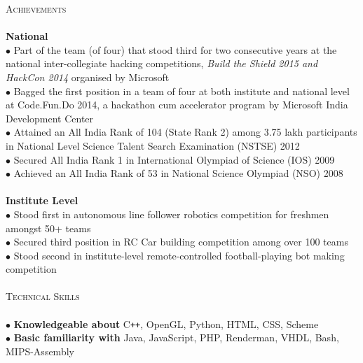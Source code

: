 \documentclass[a4paper,9pt]{article}
\begin{document}
\textcolor{myrust}{\large{\textsc{Achievements}}}\textcolor{mygray}{\sout{\hfill}}\\\\
\small %
\textbf{National}\\
$\bullet$ Part of the team (of four) that stood third for two consecutive years at the national inter-collegiate hacking competitions, \textsl{Build the Shield 2015 and HackCon 2014} organised by Microsoft\\ 
$\bullet$ Bagged the first position in a team of four at both institute and national level at Code.Fun.Do 2014, a hackathon cum accelerator program by Microsoft India Development Center\\ 
$\bullet$ Attained an All India Rank of 104 (State Rank 2) among 3.75 lakh participants in National Level Science Talent Search Examination (NSTSE) 2012\\ 
$\bullet$ Secured All India Rank 1 in International Olympiad of Science (IOS) 2009\\ 
$\bullet$ Achieved an All India Rank of 53 in National Science Olympiad (NSO) 2008\\\\
\textbf{Institute Level}\\
$\bullet$ Stood first in autonomous line follower robotics competition for freshmen amongst 50+ teams\\ 
$\bullet$ Secured third position in RC Car building competition among over 100 teams\\ 
$\bullet$ Stood second in institute-level remote-controlled football-playing bot making competition\\\\

\textcolor{myrust}{\large{\textsc{Technical Skills}}}\textcolor{mygray}{\sout{\hfill}}\\\\
\small %
$\bullet$ \textbf{Knowledgeable about} C\verb!++!, OpenGL, Python, HTML, CSS, Scheme\\
$\bullet$ \textbf{Basic familiarity with} Java, JavaScript, PHP, Renderman, VHDL, Bash, MIPS-Assembly\\\\
\end{document}
